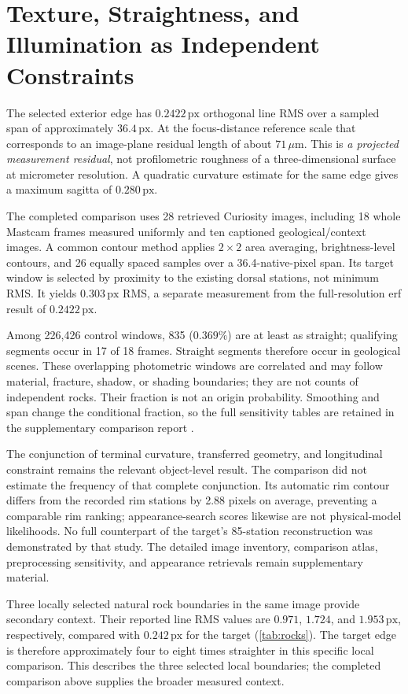 \documentclass[11pt,letterpaper]{article}
\newcommand{\px}{\,\mathrm{px}}
\begin{document}
\section{Texture, Straightness, and Illumination as Independent Constraints}
\label{sec:comparisons}

The selected exterior edge has \(0.2422\px\) orthogonal line RMS over a sampled span of approximately \(36.4\px\). At the focus-distance reference scale that corresponds to an image-plane residual length of about \(71\,\mu\mathrm m\). This is \emph{a projected measurement residual}, not profilometric roughness of a three-dimensional surface at micrometer resolution. A quadratic curvature estimate for the same edge gives a maximum sagitta of \(0.280\px\).

The completed comparison uses 28 retrieved Curiosity images, including 18 whole Mastcam frames measured uniformly and ten captioned geological/context images. A common contour method applies $2\times2$ area averaging, brightness-level contours, and 26 equally spaced samples over a 36.4-native-pixel span. Its target window is selected by proximity to the existing dorsal stations, not minimum RMS. It yields $0.303\px$ RMS, a separate measurement from the full-resolution erf result of $0.2422\px$.

Among 226,426 control windows, 835 ($0.369\%$) are at least as straight; qualifying segments occur in 17 of 18 frames. Straight segments therefore occur in geological scenes. These overlapping photometric windows are correlated and may follow material, fracture, shadow, or shading boundaries; they are not counts of independent rocks. Their fraction is not an origin probability. Smoothing and span change the conditional fraction, so the full sensitivity tables are retained in the supplementary comparison report \cite{comparison2026}.

The conjunction of terminal curvature, transferred geometry, and longitudinal constraint remains the relevant object-level result. The comparison did not estimate the frequency of that complete conjunction. Its automatic rim contour differs from the recorded rim stations by 2.88 pixels on average, preventing a comparable rim ranking; appearance-search scores likewise are not physical-model likelihoods. No full counterpart of the target's 85-station reconstruction was demonstrated by that study. The detailed image inventory, comparison atlas, preprocessing sensitivity, and appearance retrievals remain supplementary material.

Three locally selected natural rock boundaries in the same image provide secondary context. Their reported line RMS values are \(0.971\), \(1.724\), and \(1.953\px\), respectively, compared with \(0.242\px\) for the target (\cref{tab:rocks}). The target edge is therefore approximately four to eight times straighter in this specific local comparison. This describes the three selected local boundaries; the completed comparison above supplies the broader measured context.
\end{document}
